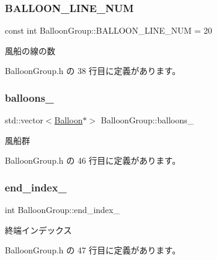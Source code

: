 \subsubsection{\texorpdfstring{B\+A\+L\+L\+O\+O\+N\+\_\+\+L\+I\+N\+E\+\_\+\+N\+UM}{BALLOON\_LINE\_NUM}}
{\footnotesize\ttfamily const int Balloon\+Group\+::\+B\+A\+L\+L\+O\+O\+N\+\_\+\+L\+I\+N\+E\+\_\+\+N\+UM = 20\hspace{0.3cm}{\ttfamily [static]}}



風船の線の数 



 Balloon\+Group.\+h の 38 行目に定義があります。

\mbox{\label{class_balloon_group_a20dd8b50558bbbb0e8169bccea50261b}} 
\subsubsection{\texorpdfstring{balloons\+\_\+}{balloons\_}}
{\footnotesize\ttfamily std\+::vector$<$\mbox{\hyperlink{class_balloon}{Balloon}}$\ast$$>$ Balloon\+Group\+::balloons\+\_\+\hspace{0.3cm}{\ttfamily [private]}}



風船群 



 Balloon\+Group.\+h の 46 行目に定義があります。

\mbox{\label{class_balloon_group_a7ec7d71eb6d9e333ccf3fc2017bfe9b2}} 
\subsubsection{\texorpdfstring{end\+\_\+index\+\_\+}{end\_index\_}}
{\footnotesize\ttfamily int Balloon\+Group\+::end\+\_\+index\+\_\+\hspace{0.3cm}{\ttfamily [private]}}



終端インデックス 



 Balloon\+Group.\+h の 47 行目に定義があります。

